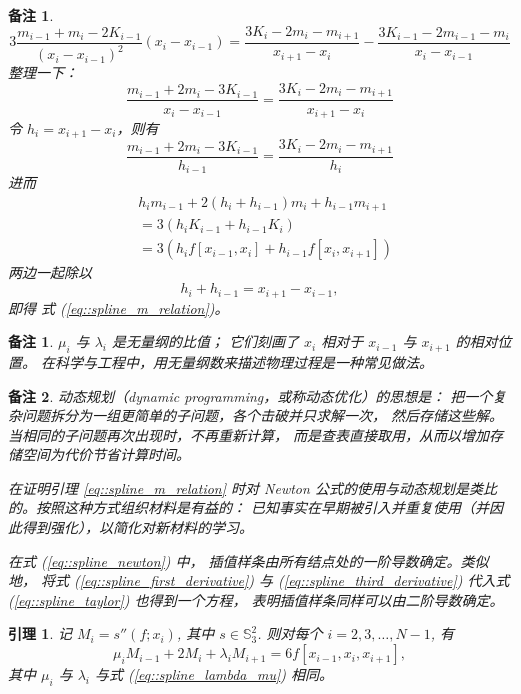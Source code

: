 \documentclass[a4paper]{ctexart}
\newtheorem{remark}{备注}
\newtheorem*{remark*}{备注}
\newtheorem{lemma}[theorem]{引理}
\numberwithin{theorem}{section}
\numberwithin{equation}{section}
\numberwithin{figure}{section}
\numberwithin{remark}{section}
\begin{document}
\begin{remark*}
    \[
    3 \frac{m_{i - 1} + m_i - 2 K_{i - 1}}{(x_i - x_{i - 1})^2} (x_i - x_{i - 1})
    = \frac{3 K_i - 2 m_i - m_{i + 1}}{x_{i + 1} - x_i} - \frac{3 K_{i - 1} - 2 m_{i - 1} - m_i}{x_i - x_{i - 1}}
    \]
    整理一下：
    \[
    \frac{m_{i - 1} + 2 m_i - 3 K_{i - 1}}{x_i - x_{i - 1}}
    = \frac{3 K_i - 2 m_i - m_{i + 1}}{x_{i + 1} - x_i}
    \]
    令 $h_i = x_{i + 1} - x_i$，则有
    \[
    \frac{m_{i - 1} + 2 m_i - 3 K_{i - 1}}{h_{i - 1}}
    = \frac{3 K_i - 2 m_i - m_{i + 1}}{h_i}
    \]
    进而
    \[
    \begin{aligned}        
    & h_i m_{i - 1} + 2 (h_i + h_{i - 1}) m_i + h_{i - 1} m_{i + 1} \\
    &= 3 (h_i K_{i - 1} + h_{i - 1} K_i) \\
    &= 3 (h_i f[x_{i - 1}, x_i] + h_{i - 1} f[x_i, x_{i + 1}])
    \end{aligned}
    \]
    两边一起除以 
    \[
    h_i + h_{i - 1} = x_{i + 1} - x_{i - 1},
    \]
    即得 式 (\ref{eq::spline_m_relation})。
\end{remark*}

\begin{remark}
$\mu_i$ 与 $\lambda_i$ 是无量纲的比值；
它们刻画了 $x_i$ 相对于 $x_{i-1}$ 与 $x_{i+1}$ 的相对位置。
在科学与工程中，用无量纲数来描述物理过程是一种常见做法。
\end{remark}

\begin{remark}
动态规划（dynamic programming，或称动态优化）的思想是：
把一个复杂问题拆分为一组更简单的子问题，各个击破并只求解一次，
然后存储这些解。当相同的子问题再次出现时，不再重新计算，
而是查表直接取用，从而以增加存储空间为代价节省计算时间。

在证明引理 \ref{eq::spline_m_relation} 时对 Newton 
公式的使用与动态规划是类比的。按照这种方式组织材料是有益的：
已知事实在早期被引入并重复使用（并因此得到强化），以简化对新材料的学习。

在式 (\ref{eq::spline_newton}) 中，
插值样条由所有结点处的一阶导数确定。类似地，
将式 (\ref{eq::spline_first_derivative}) 
与 (\ref{eq::spline_third_derivative}) 
代入式 (\ref{eq::spline_taylor}) 也得到一个方程，
表明插值样条同样可以由二阶导数确定。
\end{remark}

\begin{lemma}
    \label{lem::spline_M_relation}
记 $M_i=s''(f; x_i)$, 其中 $s\in \mathbb{S}_3^{2}$. 
则对每个 $i=2,3,\ldots,N-1$, 有
\begin{equation}
    \label{eq::spline_M_relation}
\mu_i M_{i-1}+2M_i+\lambda_i M_{i+1}=6 f[x_{i-1},x_i,x_{i+1}],
\end{equation}
其中 $\mu_i$ 与 $\lambda_i$ 与式 (\ref{eq::spline_lambda_mu}) 相同。
\end{lemma}
\end{document}
